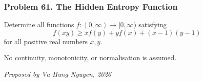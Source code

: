 \subsubsection*{Problem 61. The Hidden Entropy Function}

\begin{exercisebox}[hard]

Determine all functions $f:(0,\infty)\to[0,\infty)$ satisfying
\[
\boxed{\qquad
f(xy)\ge x f(y)+y f(x)+(x-1)(y-1)
\qquad}
\]
for all positive real numbers $x,y$.

No continuity, monotonicity, or normalisation is assumed.

\begin{flushright}
\textit{Proposed by Vu Hung Nguyen, 2026}
\end{flushright}


\end{exercisebox}
